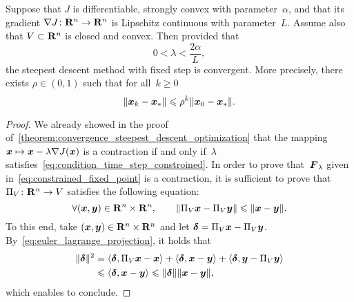 \begin{theorem}
    \label{theorem:convergence_steepest_descent_optimization_constraint}
    Suppose that $J$ is differentiable, strongly convex with parameter~$\alpha$,
    and that its gradient $\nabla J \colon \mathbf R^n \to \mathbf R^n$ is Lipschitz continuous with parameter~$L$.
    Assume also that $V \subset \mathbf R^n$ is closed and convex.
    Then provided that
    \begin{equation}
        \label{eq:condition_time_step_constroined}
        0 < \lambda < \frac{2 \alpha}{L},
    \end{equation}
    the steepest descent method with fixed step is convergent.
    More precisely,
    there exists $\rho \in (0, 1)$ such that for all~$k \geq 0$
    \begin{equation*}
        \lVert\mathbf{\boldsymbol{x}}_k - \mathbf{\boldsymbol{x}}_*\rVert \leqslant \rho^k \lVert\mathbf{\boldsymbol{x}}_0 - \mathbf{\boldsymbol{x}}_*\rVert.
    \end{equation*}
\end{theorem}
\begin{proof}
    We already showed in the proof of~\cref{theorem:convergence_steepest_descent_optimization} that the mapping $\mathbf{\boldsymbol{x}} \mapsto \mathbf{\boldsymbol{x}} - \lambda \nabla J(\mathbf{\boldsymbol{x}})$ is a contraction if and only if~$\lambda$ satisfies~\eqref{eq:condition_time_step_constroined}.
    In order to prove that~$\mathbf{\boldsymbol{F}}_{\lambda}$ given in~\eqref{eq:constrained_fixed_point} is a contraction,
    it is sufficient to prove that $\Pi_V \colon \mathbf R^n \to V$ satisfies the following equation:
    \[
        \forall (\mathbf{\boldsymbol{x}}, \mathbf{\boldsymbol{y}}) \in \mathbf R^n \times \mathbf R^n, \qquad
        \lVert\Pi_V \mathbf{\boldsymbol{x}} - \Pi_V \mathbf{\boldsymbol{y}}\rVert \leqslant \lVert\mathbf{\boldsymbol{x}} - \mathbf{\boldsymbol{y}}\rVert.
    \]
    To this end, take $(\mathbf{\boldsymbol{x}}, \mathbf{\boldsymbol{y}}) \in \mathbf R^n \times \mathbf R^n$ and let $\mathbf{\boldsymbol{\delta}} = \Pi_V \mathbf{\boldsymbol{x}} - \Pi_V \mathbf{\boldsymbol{y}}$.
    By~\eqref{eq:euler_lagrange_projection},
    it holds that
    \begin{align*}
        \lVert\mathbf{\boldsymbol{\delta}}\rVert^2
        &= \langle\mathbf{\boldsymbol{\delta}}, \Pi_V \mathbf{\boldsymbol{x}} - \mathbf{\boldsymbol{x}}\rangle + \langle\mathbf{\boldsymbol{\delta}}, \mathbf{\boldsymbol{x}} - \mathbf{\boldsymbol{y}}\rangle + \langle\mathbf{\boldsymbol{\delta}}, \mathbf{\boldsymbol{y}} - \Pi_V \mathbf{\boldsymbol{y}}\rangle \\
        &\leqslant \langle\mathbf{\boldsymbol{\delta}}, \mathbf{\boldsymbol{x}} - \mathbf{\boldsymbol{y}}\rangle \leqslant \lVert\mathbf{\boldsymbol{\delta}}\rVert \lVert\mathbf{\boldsymbol{x}} - \mathbf{\boldsymbol{y}}\rVert,
    \end{align*}
    which enables to conclude.
\end{proof}
